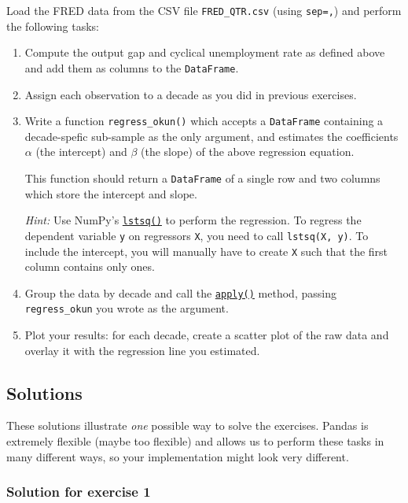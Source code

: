 \documentclass[10pt]{scrartcl}
\begin{document}
Load the FRED data from the CSV file \texttt{FRED\_QTR.csv} (using
\texttt{sep=\textquotesingle{},\textquotesingle{}}) and perform the
following tasks:

\begin{enumerate}
\def\labelenumi{\arabic{enumi}.}
\item
  Compute the output gap and cyclical unemployment rate as defined above
  and add them as columns to the \texttt{DataFrame}.
\item
  Assign each observation to a decade as you did in previous exercises.
\item
  Write a function \texttt{regress\_okun()} which accepts a
  \texttt{DataFrame} containing a decade-spefic sub-sample as the only
  argument, and estimates the coefficients \(\alpha\) (the intercept)
  and \(\beta\) (the slope) of the above regression equation.

  This function should return a \texttt{DataFrame} of a single row and
  two columns which store the intercept and slope.

  \emph{Hint:} Use NumPy's
  \href{https://numpy.org/doc/stable/reference/generated/numpy.linalg.lstsq.html}{\texttt{lstsq()}}
  to perform the regression. To regress the dependent variable
  \texttt{y} on regressors \texttt{X}, you need to call
  \texttt{lstsq(X,\ y)}. To include the intercept, you will manually
  have to create \texttt{X} such that the first column contains only
  ones.
\item
  Group the data by decade and call the
  \href{https://pandas.pydata.org/pandas-docs/stable/reference/api/pandas.core.groupby.GroupBy.apply.html}{\texttt{apply()}}
  method, passing \texttt{regress\_okun} you wrote as the argument.
\item
  Plot your results: for each decade, create a scatter plot of the raw
  data and overlay it with the regression line you estimated.
\end{enumerate}


\hypertarget{solutions}{%
\subsection{Solutions}\label{solutions}}

These solutions illustrate \emph{one} possible way to solve the
exercises. Pandas is extremely flexible (maybe too flexible) and allows
us to perform these tasks in many different ways, so your implementation
might look very different.

    \hypertarget{solution-for-exercise-1}{%
\subsubsection{Solution for exercise 1}\label{solution-for-exercise-1}}
\end{document}
